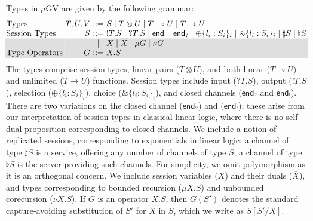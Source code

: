 \documentclass[orivec,envcountsame]{llncs}
\newcommand{\with}{\mathbin\binampersand}
\newcommand{\gvdual}[1]{\overline{#1}}
\newcommand{\gvout}[2]{{!#1.#2}}
\newcommand{\gvin}[2]{{?#1.#2}}
\newcommand{\lto}{\ensuremath{\multimap}}
\newcommand{\uto}{\ensuremath{\rightarrow}}
\newcommand{\outterm}{\mkwd{end}_!}
\newcommand{\interm}{\mkwd{end}_?}
\newcommand{\gvserver}[1]{\flat #1}
\newcommand{\gvservice}[1]{\sharp #1}
\newcommand{\mkwd}[1]{\mathsf{#1}}
\newcommand{\mugv}{$\mu\mathrm{GV}$\xspace}
\newcommand\shaderow{\noalign{\vskip-0.4pt}\rowcolor{shade}[0.6mm]}
\begin{document}
Types in \mugv are given by the following grammar:
\small
\[
\begin{array}{@{}l@{~}r@{~}c@{~}l@{}}
  \text{Types}         & T,U,V & ::= & S \mid T \otimes U \mid T \lto U \mid T \uto U \\
  \text{Session Types} & S     & ::= & \gvout{T}{S} \mid \gvin{T}{S}
                                \mid   \outterm \mid \interm
                                \mid   \oplus \{ l_i : S_i \}_i \mid \with \{ l_i : S_i \}_i
                                \mid   \gvservice{S} \mid \gvserver{S} \\ \shaderow
                            & & \mid & X \mid \gvdual{X}
                                \mid   {\mu G} \mid {\nu G} \\  \shaderow
  \text{Type Operators} & G    & ::= & X.S \\
\end{array}
\]\normalsize%
%
The types comprise session types, linear pairs ($T \otimes U$), and both linear ($T \lto U$) and
unlimited ($T \uto U$) functions.
%
Session types include input ($\gvin{T}{S}$), output ($\gvout{T}{S}$), selection ($\oplus\{ l_i:S_i
\}_i$), choice ($\with\{l_i:S_i\}_i$), and closed channels ($\interm$ and $\outterm$). There are two
variations on the closed channel ($\interm$) and ($\outterm$); these arise from our interpretation
of session types in classical linear logic, where there is no self-dual proposition corresponding to
closed channels.  We include a notion of replicated sessions, corresponding to exponentials in
linear logic: a channel of type $\gvservice{S}$ is a service, offering any number of channels of
type $S$; a channel of type $\gvserver{S}$ is the server providing such channels.
%
%
For simplicity, we omit polymorphism as it is an orthogonal concern.
%
We include session variables ($X$) and their duals ($\gvdual{X}$), and types corresponding to
bounded recursion ($\mu X.S$) and unbounded corecursion ($\nu X.S$). If $G$ is an operator $X.S$,
then $G(S')$ denotes the standard capture-avoiding substitution of $S'$ for $X$ in $S$, which we
write as $S[S'/X]$.
\end{document}
